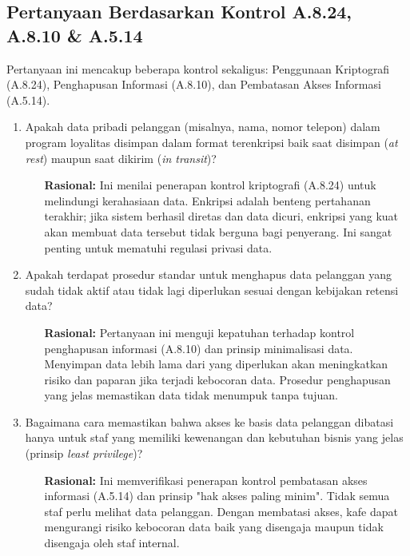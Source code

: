 \documentclass[12pt, a4paper]{report}
\begin{document}
\subsection{Pertanyaan Berdasarkan Kontrol A.8.24, A.8.10 \& A.5.14}
Pertanyaan ini mencakup beberapa kontrol sekaligus: Penggunaan Kriptografi (A.8.24), Penghapusan Informasi (A.8.10), dan Pembatasan Akses Informasi (A.5.14).
\begin{enumerate}
    \item Apakah data pribadi pelanggan (misalnya, nama, nomor telepon) dalam program loyalitas disimpan dalam format terenkripsi baik saat disimpan (\textit{at rest}) maupun saat dikirim (\textit{in transit})?
    \begin{itemize}
        \item[\textbf{Rasional:}] Ini menilai penerapan kontrol kriptografi (A.8.24) untuk melindungi kerahasiaan data. Enkripsi adalah benteng pertahanan terakhir; jika sistem berhasil diretas dan data dicuri, enkripsi yang kuat akan membuat data tersebut tidak berguna bagi penyerang. Ini sangat penting untuk mematuhi regulasi privasi data.
    \end{itemize}

    \item Apakah terdapat prosedur standar untuk menghapus data pelanggan yang sudah tidak aktif atau tidak lagi diperlukan sesuai dengan kebijakan retensi data?
    \begin{itemize}
        \item[\textbf{Rasional:}] Pertanyaan ini menguji kepatuhan terhadap kontrol penghapusan informasi (A.8.10) dan prinsip minimalisasi data. Menyimpan data lebih lama dari yang diperlukan akan meningkatkan risiko dan paparan jika terjadi kebocoran data. Prosedur penghapusan yang jelas memastikan data tidak menumpuk tanpa tujuan.
    \end{itemize}
    
    \item Bagaimana cara memastikan bahwa akses ke basis data pelanggan dibatasi hanya untuk staf yang memiliki kewenangan dan kebutuhan bisnis yang jelas (prinsip \textit{least privilege})? \citep{ratnasari2021pelindungan}
    \begin{itemize}
        \item[\textbf{Rasional:}] Ini memverifikasi penerapan kontrol pembatasan akses informasi (A.5.14) dan prinsip "hak akses paling minim". Tidak semua staf perlu melihat data pelanggan. Dengan membatasi akses, kafe dapat mengurangi risiko kebocoran data baik yang disengaja maupun tidak disengaja oleh staf internal.
    \end{itemize}
\end{enumerate}
\end{document}
